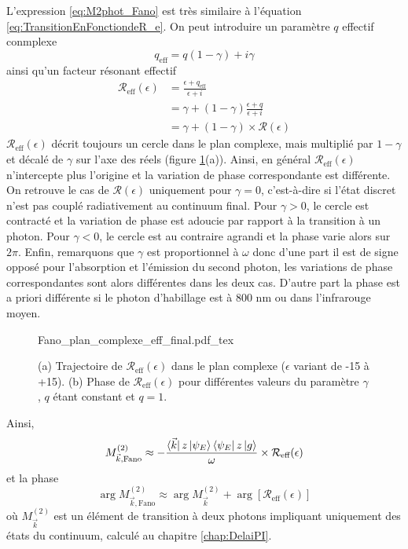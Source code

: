 L'expression \ref{eq:M2phot_Fano} est très similaire à l'équation \ref{eq:TransitionEnFonctiondeR_e}. On peut introduire un paramètre $q$ effectif conmplexe
\begin{equation}
q_{\text{eff}} = q(1-\gamma) + i \gamma
\end{equation}
ainsi qu'un facteur résonant effectif
\begin{align}
\mathcal{R}_{\text{eff}}(\epsilon) & = \frac{\epsilon + q_{\text{eff}}}{\epsilon + i}\\
& = \gamma + (1 - \gamma) \frac{\epsilon + q}{\epsilon + i}\\
& = \gamma + (1 - \gamma) \times \mathcal{R}(\epsilon) 
\end{align}
$\mathcal{R}_{\text{eff}}(\epsilon)$ décrit toujours un cercle dans le plan complexe, mais multiplié par $1 - \gamma$ et décalé de $\gamma$ sur l'axe des réels (figure \ref{fig:FanoComplexeEffectif}(a)). Ainsi, en général $\mathcal{R}_{\text{eff}}(\epsilon)$ n'intercepte plus l'origine et la variation de phase correspondante est différente. On retrouve le cas de $\mathcal{R}(\epsilon)$ uniquement pour $\gamma = 0$, c'est-à-dire si l'état discret n'est pas couplé radiativement au continuum final. Pour $\gamma > 0$, le cercle est contracté et la variation de phase est adoucie par rapport à la transition à un photon. Pour $\gamma < 0$, le cercle est au contraire agrandi et la phase varie alors sur $2 \pi$. Enfin, remarquons que $\gamma$ est proportionnel à $\omega$ donc d'une part il est de signe opposé pour l'absorption et l'émission du second photon, les variations de phase correspondantes sont alors différentes dans les deux cas. D'autre part la phase est a priori différente si le photon d'habillage est à 800 nm ou dans l'infrarouge moyen.

\begin{figure}
\centering
\def\svgwidth{\textwidth}
{Fano_plan_complexe_eff_final.pdf_tex}
\caption{(a) Trajectoire de $\mathcal{R}_{\text{eff}}(\epsilon)$ dans le plan complexe ($\epsilon$ variant de -15 à +15). (b) Phase de $\mathcal{R}_{\text{eff}}(\epsilon)$ pour différentes valeurs du paramètre $\gamma$, $q$ étant constant et $q = 1$.}
\label{fig:FanoComplexeEffectif}
\end{figure}

Ainsi,
\begin{equation}
M_{\vec{k}, \text{Fano}}^{(2)} \approx - \frac{\bra{\vec{k}} z \ket{\psi_E} \bra{\psi_E} z \ket{g}}{\omega} \times \mathcal{R}_{\text{eff}}(\epsilon)
\end{equation}
et la phase
\begin{equation}
\arg M_{\vec{k}, \text{Fano}}^{(2)} \approx \arg M_{\vec{k}}^{(2)} + \arg [\mathcal{R}_{\text{eff}}(\epsilon)]
\end{equation}
où $M_{\vec{k}}^{(2)}$ est un élément de transition à deux photons impliquant uniquement des états du continuum, calculé au chapitre \ref{chap:DelaiPI}.

